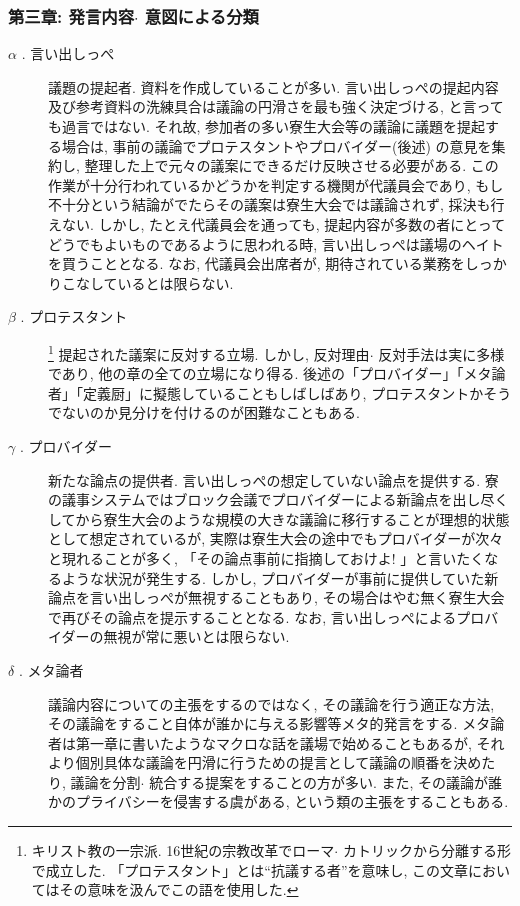 \documentclass[10pt,b5jsbook,dvips,dvipdfmx,openany]{jsbook}
\theoremstyle{definition}
\begin{document}
			\subsubsection{第三章: 発言内容$ \cdot $ 意図による分類}
			\begin{description}

			\item[$ \alpha $ . 言い出しっぺ]

			議題の提起者. 資料を作成していることが多い. 言い出しっぺの提起内容及び参考資料の洗練具合は議論の円滑さを最も強く決定づける, と言っても過言ではない. それ故, 参加者の多い寮生大会等の議論に議題を提起する場合は, 事前の議論でプロテスタントやプロバイダー(後述) の意見を集約し, 整理した上で元々の議案にできるだけ反映させる必要がある. この作業が十分行われているかどうかを判定する機関が代議員会であり, もし不十分という結論がでたらその議案は寮生大会では議論されず, 採決も行えない. しかし, たとえ代議員会を通っても, 提起内容が多数の者にとってどうでもよいものであるように思われる時, 言い出しっぺは議場のヘイトを買うこととなる. なお, 代議員会出席者が, 期待されている業務をしっかりこなしているとは限らない. 

			\item[$ \beta $ . プロテスタント]  \footnote{キリスト教の一宗派. 16世紀の宗教改革でローマ$ \cdot $ カトリックから分離する形で成立した. 「プロテスタント」とは“抗議する者''を意味し, この文章においてはその意味を汲んでこの語を使用した. }
提起された議案に反対する立場. しかし, 反対理由$ \cdot $ 反対手法は実に多様であり, 他の章の全ての立場になり得る. 後述の「プロバイダー」「メタ論者」「定義厨」に擬態していることもしばしばあり, プロテスタントかそうでないのか見分けを付けるのが困難なこともある. 


			\item[$ \gamma $ . プロバイダー]

			新たな論点の提供者. 言い出しっぺの想定していない論点を提供する. 寮の議事システムではブロック会議でプロバイダーによる新論点を出し尽くしてから寮生大会のような規模の大きな議論に移行することが理想的状態として想定されているが, 実際は寮生大会の途中でもプロバイダーが次々と現れることが多く, 「その論点事前に指摘しておけよ! 」と言いたくなるような状況が発生する. しかし, プロバイダーが事前に提供していた新論点を言い出しっぺが無視することもあり, その場合はやむ無く寮生大会で再びその論点を提示することとなる. なお, 言い出しっぺによるプロバイダーの無視が常に悪いとは限らない. 


			\item[$ \delta $ . メタ論者]

			議論内容についての主張をするのではなく, その議論を行う適正な方法, その議論をすること自体が誰かに与える影響等メタ的発言をする. 
メタ論者は第一章に書いたようなマクロな話を議場で始めることもあるが, それより個別具体な議論を円滑に行うための提言として議論の順番を決めたり, 議論を分割$ \cdot $ 統合する提案をすることの方が多い. また, その議論が誰かのプライバシーを侵害する虞がある, という類の主張をすることもある. 


\end{description}
\end{document}
